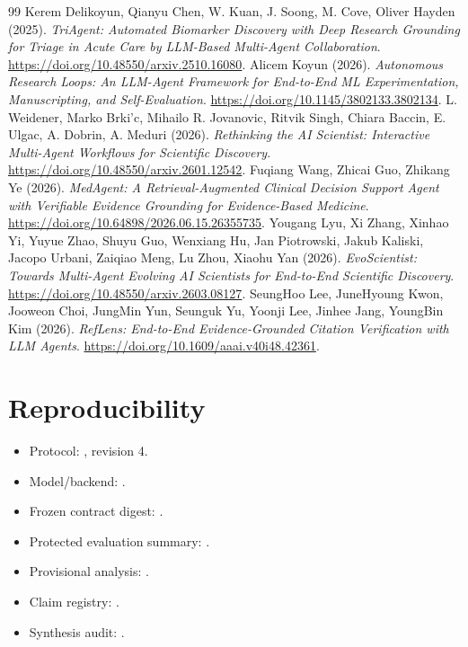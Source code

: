 \documentclass[11pt]{article}
\begin{document}
\begin{thebibliography}{99}
Kerem Delikoyun, Qianyu Chen, W. Kuan, J. Soong, M. Cove, Oliver Hayden (2025). \newblock \emph{TriAgent: Automated Biomarker Discovery with Deep Research Grounding for Triage in Acute Care by LLM-Based Multi-Agent Collaboration}. \newblock \url{https://doi.org/10.48550/arxiv.2510.16080}.
Alicem Koyun (2026). \newblock \emph{Autonomous Research Loops: An LLM-Agent Framework for End-to-End ML Experimentation, Manuscripting, and Self-Evaluation}. \newblock \url{https://doi.org/10.1145/3802133.3802134}.
L. Weidener, Marko Brki'c, Mihailo R. Jovanovic, Ritvik Singh, Chiara Baccin, E. Ulgac, A. Dobrin, A. Meduri (2026). \newblock \emph{Rethinking the AI Scientist: Interactive Multi-Agent Workflows for Scientific Discovery}. \newblock \url{https://doi.org/10.48550/arxiv.2601.12542}.
Fuqiang Wang, Zhicai Guo, Zhikang Ye (2026). \newblock \emph{MedAgent: A Retrieval-Augmented Clinical Decision Support Agent with Verifiable Evidence Grounding for Evidence-Based Medicine}. \newblock \url{https://doi.org/10.64898/2026.06.15.26355735}.
Yougang Lyu, Xi Zhang, Xinhao Yi, Yuyue Zhao, Shuyu Guo, Wenxiang Hu, Jan Piotrowski, Jakub Kaliski, Jacopo Urbani, Zaiqiao Meng, Lu Zhou, Xiaohu Yan (2026). \newblock \emph{EvoScientist: Towards Multi-Agent Evolving AI Scientists for End-to-End Scientific Discovery}. \newblock \url{https://doi.org/10.48550/arxiv.2603.08127}.
SeungHoo Lee, JuneHyoung Kwon, Jooweon Choi, JungMin Yun, Seunguk Yu, Yoonji Lee, Jinhee Jang, YoungBin Kim (2026). \newblock \emph{RefLens: End-to-End Evidence-Grounded Citation Verification with LLM Agents}. \newblock \url{https://doi.org/10.1609/aaai.v40i48.42361}.
\end{thebibliography}

\section{Reproducibility}
\begin{itemize}[leftmargin=*]
\item Protocol: , revision 4.
\item Model/backend: .
\item Frozen contract digest: .
\item Protected evaluation summary: .
\item Provisional analysis: .
\item Claim registry: .
\item Synthesis audit: .
\end{itemize}
\end{document}
